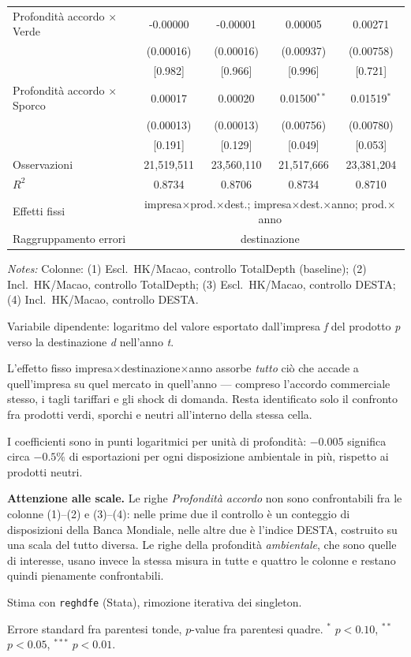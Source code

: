\begin{table}[htbp]
\begin{threeparttable}
\begin{tabular}{lcccc}
\addlinespace
Profondit\`a accordo $\times$ Verde & -0.00000 & -0.00001 & 0.00005 & 0.00271 \\
 & (0.00016) & (0.00016) & (0.00937) & (0.00758) \\
 & [0.982] & [0.966] & [0.996] & [0.721] \\
\addlinespace
Profondit\`a accordo $\times$ Sporco & 0.00017 & 0.00020 & 0.01500$^{**}$ & 0.01519$^{*}$ \\
 & (0.00013) & (0.00013) & (0.00756) & (0.00780) \\
 & [0.191] & [0.129] & [0.049] & [0.053] \\
\addlinespace
\midrule
Osservazioni & 21,519,511 & 23,560,110 & 21,517,666 & 23,381,204 \\
$R^2$ & 0.8734 & 0.8706 & 0.8734 & 0.8710 \\
Effetti fissi & \multicolumn{4}{c}{impresa$\times$prod.$\times$dest.; impresa$\times$dest.$\times$anno; prod.$\times$anno} \\
Raggruppamento errori & \multicolumn{4}{c}{destinazione} \\
\bottomrule
\end{tabular}
\begin{tablenotes}[flushleft]\footnotesize
\item \emph{Notes:} Colonne: (1) Escl.\ HK/Macao, controllo TotalDepth (baseline); (2) Incl.\ HK/Macao, controllo TotalDepth; (3) Escl.\ HK/Macao, controllo DESTA; (4) Incl.\ HK/Macao, controllo DESTA.
\item Variabile dipendente: logaritmo del valore esportato dall'impresa \textit{f} del prodotto \textit{p} verso la destinazione \textit{d} nell'anno \textit{t}.
\item L'effetto fisso impresa$\times$destinazione$\times$anno assorbe \emph{tutto} ci\`o che accade a quell'impresa su quel mercato in quell'anno --- compreso l'accordo commerciale stesso, i tagli tariffari e gli shock di domanda. Resta identificato solo il confronto fra prodotti verdi, sporchi e neutri all'interno della stessa cella.
\item I coefficienti sono in punti logaritmici per unit\`a di profondit\`a: $-0.005$ significa circa $-0.5\%$ di esportazioni per ogni disposizione ambientale in pi\`u, rispetto ai prodotti neutri.
\item \textbf{Attenzione alle scale.} Le righe \emph{Profondit\`a accordo} non sono confrontabili fra le colonne (1)--(2) e (3)--(4): nelle prime due il controllo \`e un conteggio di disposizioni della Banca Mondiale, nelle altre due \`e l'indice DESTA, costruito su una scala del tutto diversa. Le righe della profondit\`a \emph{ambientale}, che sono quelle di interesse, usano invece la stessa misura in tutte e quattro le colonne e restano quindi pienamente confrontabili.
\item Stima con \texttt{reghdfe} (Stata), rimozione iterativa dei singleton.
\item Errore standard fra parentesi tonde, $p$-value fra parentesi quadre. $^{*}$ $p<0.10$, $^{**}$ $p<0.05$, $^{***}$ $p<0.01$.
\end{tablenotes}
\end{threeparttable}
\end{table}
